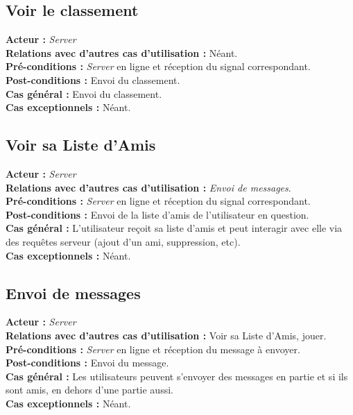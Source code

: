 \documentclass[10pt, a4paper]{article}
\begin{document}
\subsection{Voir le classement}
\textbf{Acteur :} \textit{Server} \\
\textbf{Relations avec d'autres cas d'utilisation :} Néant. \\
\textbf{Pré-conditions :} \textit{Server} en ligne et réception du signal correspondant. \\
\textbf{Post-conditions :} Envoi du classement. \\
\textbf{Cas général :} Envoi du classement. \\
\textbf{Cas exceptionnels :} Néant. \\

\subsection{Voir sa Liste d'Amis}
\textbf{Acteur :} \textit{Server} \\
\textbf{Relations avec d'autres cas d'utilisation :} {\itshape Envoi de messages}. \\
\textbf{Pré-conditions :} \textit{Server} en ligne et réception du signal correspondant. \\
\textbf{Post-conditions :} Envoi de la liste d'amis de l'utilisateur en question. \\
\textbf{Cas général :} L'utilisateur reçoit sa liste d'amis et peut interagir avec elle via des requêtes serveur (ajout d'un ami, suppression, etc).\\
\textbf{Cas exceptionnels :} Néant. \\

\subsection{Envoi de messages}
\textbf{Acteur :} \textit{Server} \\
\textbf{Relations avec d'autres cas d'utilisation :} Voir sa Liste d'Amis, jouer. \\
\textbf{Pré-conditions :} \textit{Server} en ligne et réception du message à envoyer. \\
\textbf{Post-conditions :} Envoi du message. \\
\textbf{Cas général :} Les utilisateurs peuvent s'envoyer des messages en partie et si ils sont amis, en dehors d'une partie aussi. \\
\textbf{Cas exceptionnels :} Néant. \\
\end{document}
